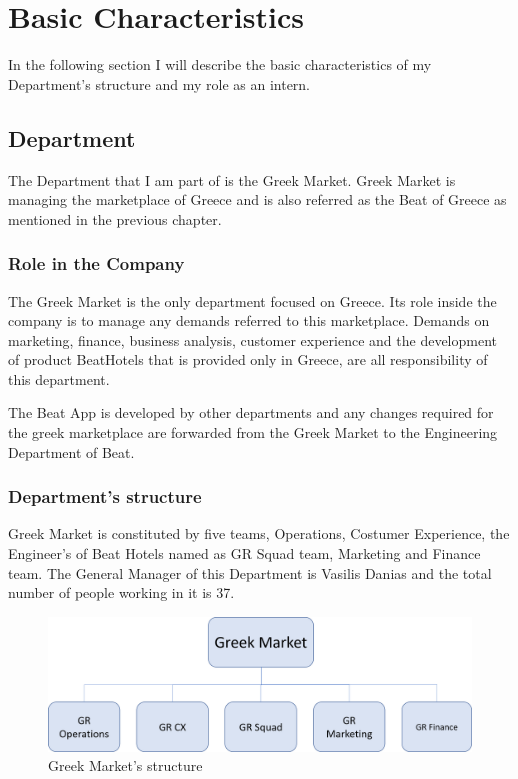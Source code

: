 
\chapter{Basic Characteristics} %
In the following section I will describe the basic characteristics of my Department’s structure and my role as an intern.
\label{Chapter2} 

\section{ Department }
The Department that I am part of is the Greek Market. Greek Market is managing the marketplace of Greece and is also referred as the Beat of Greece as mentioned in the previous chapter.

\subsection{Role in the Company}
The Greek Market is the only department focused on Greece. Its role inside the company is to manage any demands referred to this marketplace. Demands on marketing, finance, business analysis, customer experience and the development of product BeatHotels that is provided only in Greece, are all responsibility of this department.\par 
The Beat App is developed by other departments and any changes required for the greek marketplace are forwarded from the Greek Market to the Engineering Department of Beat.

\subsection{Department's structure}
Greek Market is constituted by five teams, Operations, Costumer Experience, the Engineer's of Beat Hotels named as GR Squad team, Marketing and Finance team. The General Manager of this Department is Vasilis Danias and the total number of people working in it is 37. 
\begin{figure}[h!]
	\begin{center}
		\includegraphics[scale=0.4]{images/GR_Market_structure.png}
	\end{center}
	\caption{Greek Market's structure}
\end{figure}

